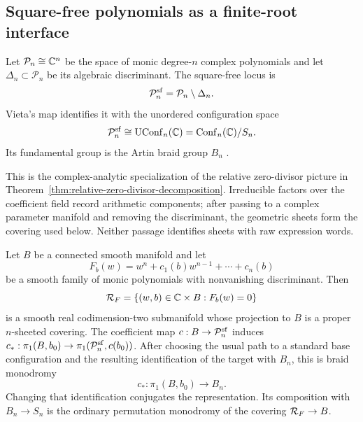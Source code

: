 \subsection{Square-free polynomials as a finite-root interface}

Let $\mathcal P_n\cong\mathbb{C}^n$ be the space of monic degree-$n$ complex
polynomials and let $\Delta_n\subset\mathcal P_n$ be its algebraic discriminant.
The square-free locus is
\[
 \mathcal P^{\mathrm{sf}}_n=\mathcal P_n\setminus\Delta_n.
\]
Vieta's map identifies it with the unordered configuration space
\begin{equation}
 \mathcal P^{\mathrm{sf}}_n\cong\operatorname{UConf}_n(\mathbb{C})
 =\operatorname{Conf}_n(\mathbb{C})/S_n.
 \label{eq:vieta-configuration}
\end{equation}
Its fundamental group is the Artin braid group $B_n$
\cite{Artin1925TheorieDerZoepfe,FadellNeuwirth1962ConfigurationSpaces,Birman1974Braids}.

This is the complex-analytic specialization of the relative zero-divisor picture
in Theorem~\ref{thm:relative-zero-divisor-decomposition}.  Irreducible factors over
the coefficient field record arithmetic components; after passing to a complex
parameter manifold and removing the discriminant, the geometric sheets form the
covering used below.  Neither passage identifies sheets with raw expression words.

\begin{theorem}
\label{thm:finite-root-braid}
Let $B$ be a connected smooth manifold and let
\begin{equation}
 F_b(w)=w^n+c_1(b)w^{n-1}+\cdots+c_n(b)
 \label{eq:polynomial-family}
\end{equation}
be a smooth family of monic polynomials with nonvanishing discriminant.  Then
\begin{equation}
 \mathcal R_F=\{(w,b)\in\mathbb{C}\times B:F_b(w)=0\}
 \label{eq:root-incidence}
\end{equation}
is a smooth real codimension-two submanifold whose
projection to $B$ is a proper $n$-sheeted covering.  The coefficient map
$c:B\to\mathcal P^{\mathrm{sf}}_n$ induces
$c_*:\pi_1(B,b_0)\to\pi_1(\mathcal P^{\mathrm{sf}}_n,c(b_0))$.  After choosing the usual path to a
standard base configuration and the resulting identification of the target with
$B_n$, this is braid monodromy
\begin{equation}
 c_*:\pi_1(B,b_0)\longrightarrow B_n.
 \label{eq:braid-monodromy-map}
\end{equation}
Changing that identification conjugates the representation.
Its composition with $B_n\to S_n$ is the ordinary permutation monodromy of the
covering $\mathcal R_F\to B$.
\end{theorem}

